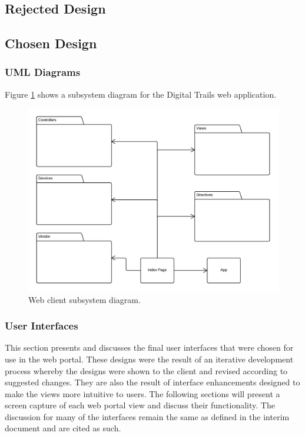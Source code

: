 \documentclass[11pt,a4paper]{report}
\begin{document}
\subsection{Rejected Design}
\label{sec:portal-rejected-design}

\subsection{Chosen Design}
\label{sec:portal-chosen-design}

\subsubsection{UML Diagrams}

Figure \ref{fig:subsystem-diagram} shows a subsystem diagram for the Digital Trails web application.

\begin{figure}[H]
\centering
\includegraphics[width=0.8\linewidth]{./img/web-client-uml/subsystem-diagram}
\caption{Web client subsystem diagram.}
\label{fig:subsystem-diagram}
\end{figure}



\subsubsection{User Interfaces}
\label{sec:portal-user-interfaces}

This section presents and discusses the final user interfaces that were chosen for use in the web portal. These designs were the result of an iterative development process whereby the designs were shown to the client and revised according to suggested changes. They are also the result of interface enhancements designed to make the views more intuitive to users. The following sections will present a screen capture of each web portal view and discuss their functionality. The discussion for many of the interfaces remain the same as defined in the interim document and are cited as such.
\end{document}

